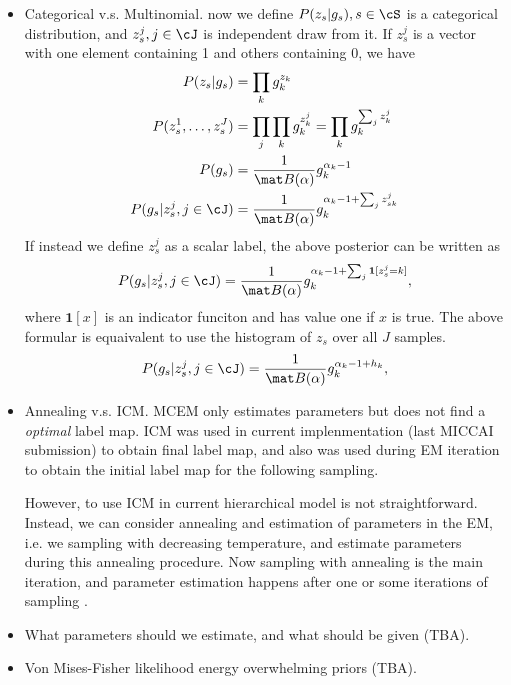 \documentclass{article}
\begin{document}
\begin{itemize}
  \item Categorical v.s. Multinomial. now we define $P(z_s|g_s), s\in \cS$ is a categorical distribution, and $z^j_s, j\in \cJ$ is independent draw from it. If $z_s^j$ is a vector with one element containing 1 and others containing $0$, we have
    \begin{align*}
      P(z_s|g_s) &= \prod_k g_k^{z_k}\\
      P(z_s^1,\dots, z_s^J) &= \prod_j \prod_k g_k^{z_k^j} = \prod_k g_k ^{\sum_j z_k^j}\\
      P(g_s) &= \frac{1}{\mat B(\alpha)} g_k^{\alpha_k - 1} \\
      P(g_s | z_s^j, j\in \cJ) &= \frac{1}{\mat B(\alpha)} g_k^{\alpha_k - 1 + \sum_j z_{sk}^j } 
    \end{align*}
    If instead we define $z_s^j$ as a scalar label, the above posterior can be written as
    \begin{equation*}
      P(g_s | z_s^j, j\in \cJ) = \frac{1}{\mat B(\alpha)} g_k^{\alpha_k - 1 + \sum_j \mathbf{1}[z_s^j = k] },
    \end{equation*}
    where $\mathbf{1}[x]$ is an indicator funciton and has value one if $x$ is true. The above formular is equaivalent to use the histogram of $z_s$ over all $J$ samples.
    \begin{equation*}
      P(g_s | z_s^j, j\in \cJ) = \frac{1}{\mat B(\alpha)} g_k^{\alpha_k - 1 + h_k },
    \end{equation*}
  \item Annealing v.s. ICM. MCEM only estimates parameters but does not find a \emph{optimal} label map. ICM was used in current implenmentation (last MICCAI submission) to obtain final label map, and also was used during EM iteration to obtain the initial label map for the following sampling.

    However, to use ICM in current hierarchical model is not straightforward. Instead, we can consider annealing and estimation of parameters in the EM, i.e. we sampling with decreasing temperature, and estimate parameters during this annealing procedure. Now sampling with annealing is the main iteration, and parameter estimation happens after one or some iterations of sampling \citep{lakshmanan1989simultaneous}.
  \item What parameters should we estimate, and what should be given (TBA).
  \item Von Mises-Fisher likelihood energy overwhelming priors (TBA).
\begin{figure}[htb]
  \centering
  \begin{tikzpicture}
    [node distance = 20mm,
      group/.style={circle,draw=red, thick,}, 
      par/.style={circle,draw=black, fill = black, thick, minimum size = 2pt, inner sep=0pt}, 
      subject/.style={circle, draw=blue, thick},
      fmri/.style={circle, draw=blue, thick, node distance=50mm},
      darc/.style={->, semithick, >=stealth'},
      uarc/.style={-, semithick}]



\end{tikzpicture}
\end{figure}
\end{itemize}
\end{document}
